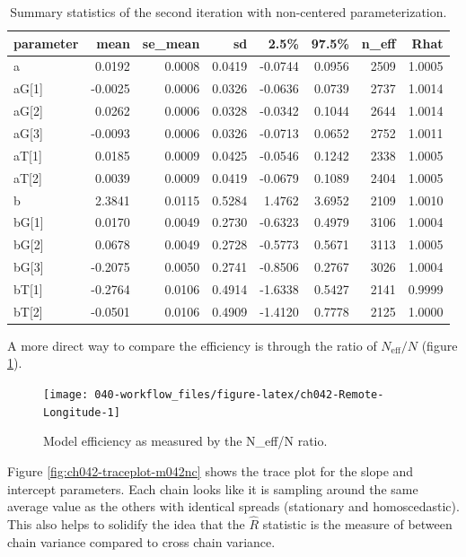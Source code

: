 \documentclass[11pt, oneside, openany]{scrbook}
\begin{document}
\begin{table}[!h]

\caption{\label{tab:ch042-Bleeding-Tuna}Summary statistics of the second iteration with non-centered parameterization.}
\centering
\begin{tabular}[t]{lrrrrrrr}
\toprule
parameter & mean & se\_mean & sd & 2.5\% & 97.5\% & n\_eff & Rhat\\
\midrule
a & 0.0192 & 0.0008 & 0.0419 & -0.0744 & 0.0956 & 2509 & 1.0005\\
aG[1] & -0.0025 & 0.0006 & 0.0326 & -0.0636 & 0.0739 & 2737 & 1.0014\\
aG[2] & 0.0262 & 0.0006 & 0.0328 & -0.0342 & 0.1044 & 2644 & 1.0014\\
aG[3] & -0.0093 & 0.0006 & 0.0326 & -0.0713 & 0.0652 & 2752 & 1.0011\\
aT[1] & 0.0185 & 0.0009 & 0.0425 & -0.0546 & 0.1242 & 2338 & 1.0005\\
\addlinespace
aT[2] & 0.0039 & 0.0009 & 0.0419 & -0.0679 & 0.1089 & 2404 & 1.0005\\
b & 2.3841 & 0.0115 & 0.5284 & 1.4762 & 3.6952 & 2109 & 1.0010\\
bG[1] & 0.0170 & 0.0049 & 0.2730 & -0.6323 & 0.4979 & 3106 & 1.0004\\
bG[2] & 0.0678 & 0.0049 & 0.2728 & -0.5773 & 0.5671 & 3113 & 1.0005\\
bG[3] & -0.2075 & 0.0050 & 0.2741 & -0.8506 & 0.2767 & 3026 & 1.0004\\
\addlinespace
bT[1] & -0.2764 & 0.0106 & 0.4914 & -1.6338 & 0.5427 & 2141 & 0.9999\\
bT[2] & -0.0501 & 0.0106 & 0.4909 & -1.4120 & 0.7778 & 2125 & 1.0000\\
\bottomrule
\end{tabular}
\end{table}

A more direct way to compare the efficiency is through the ratio of \(N_{\mathrm{eff}} / N\) (figure \ref{fig:ch042-Remote-Longitude}).

\begin{figure}

{\centering \texttt{[image: 040-workflow\_files/figure-latex/ch042-Remote-Longitude-1]} 

}

\caption{Model efficiency as measured by the N\_eff/N ratio.}\label{fig:ch042-Remote-Longitude}
\end{figure}

Figure \ref{fig:ch042-traceplot-m042nc} shows the trace plot for the slope and intercept parameters. Each chain looks like it is sampling around the same average value as the others with identical spreads (stationary and homoscedastic). This also helps to solidify the idea that the \(\hat{R}\) statistic is the measure of between chain variance compared to cross chain variance.
\end{document}
